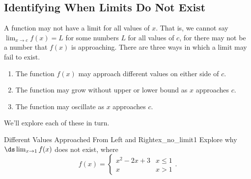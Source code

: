 \subsection*{Identifying When Limits Do Not Exist}

A function may not have a limit for all values of $x$. That is, we cannot say $\lim_{x\to c}f(x)=L$ for some numbers $L$ for all values of $c$, for there may not be a number that $f(x)$ is approaching. There are three ways in which a limit may fail to exist. 
\begin{enumerate}
\item		The function $f(x)$ may approach different values on either side of $c$.
\item		The function may grow without upper or lower bound as $x$ approaches $c$.
\item		The function may oscillate as $x$ approaches $c$.
\end{enumerate}

We'll explore each of these in turn.\\



\begin{example}{Different Values Approached From Left and Right}{ex_no_limit1}{
	Explore why $\ds\lim_{x\to 1} f(x)$ does not exist, where $$f(x) = \left\{\begin{array}{cl} x^2-2x+3 & x\leq 1 \\ x & x>1 \end{array}\right..$$}%
\end{example}

